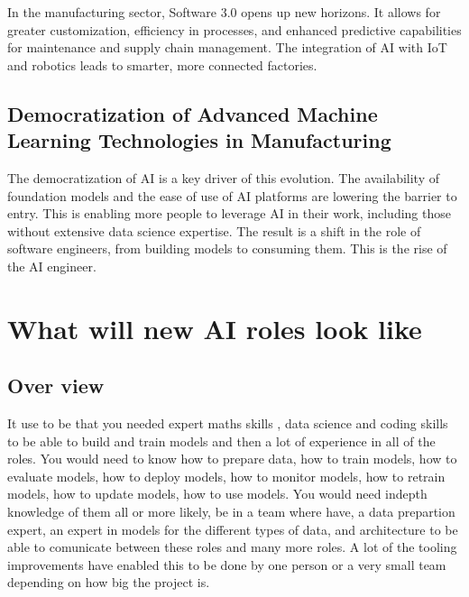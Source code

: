 \documentclass[
  letterpaper,
  DIV=11,
  numbers=noendperiod]{scrartcl}
\begin{document}
In the manufacturing sector, Software 3.0 opens up new horizons. It
allows for greater customization, efficiency in processes, and enhanced
predictive capabilities for maintenance and supply chain management. The
integration of AI with IoT and robotics leads to smarter, more connected
factories.

\hypertarget{democratization-of-advanced-machine-learning-technologies-in-manufacturing}{%
\subsection{Democratization of Advanced Machine Learning Technologies in
Manufacturing}\label{democratization-of-advanced-machine-learning-technologies-in-manufacturing}}

The democratization of AI is a key driver of this evolution. The
availability of foundation models and the ease of use of AI platforms
are lowering the barrier to entry. This is enabling more people to
leverage AI in their work, including those without extensive data
science expertise. The result is a shift in the role of software
engineers, from building models to consuming them. This is the rise of
the AI engineer.

\hypertarget{what-will-new-ai-roles-look-like}{%
\section{What will new AI roles look
like}\label{what-will-new-ai-roles-look-like}}

\hypertarget{over-view}{%
\subsection{Over view}\label{over-view}}

It use to be that you needed expert maths skills , data science and
coding skills to be able to build and train models and then a lot of
experience in all of the roles. You would need to know how to prepare
data, how to train models, how to evaluate models, how to deploy models,
how to monitor models, how to retrain models, how to update models, how
to use models. You would need indepth knowledge of them all or more
likely, be in a team where have, a data prepartion expert, an expert in
models for the different types of data, and architecture to be able to
comunicate between these roles and many more roles. A lot of the tooling
improvements have enabled this to be done by one person or a very small
team depending on how big the project is.
\end{document}
